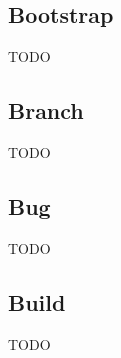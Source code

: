 \vspace{2em}
\subsection*{Bootstrap}
TODO

\vspace{2em}
\subsection*{Branch}
TODO

\vspace{2em}
\subsection*{Bug}
TODO

\vspace{2em}
\subsection*{Build}
TODO
